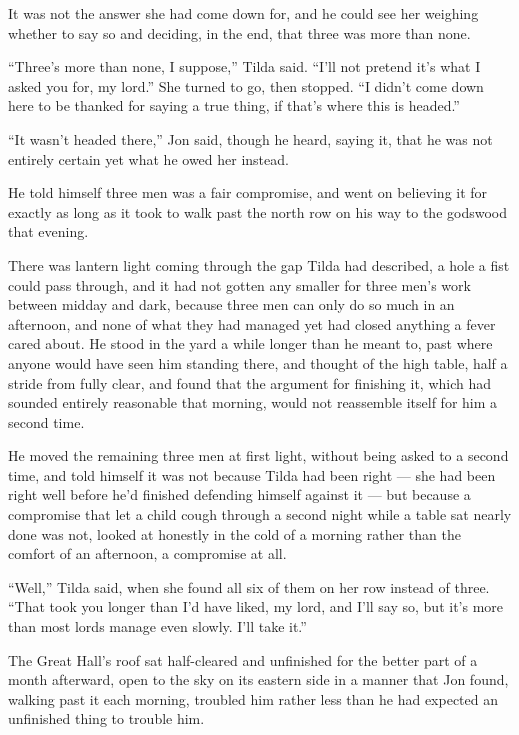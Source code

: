 It was not the answer she had come down for, and he could see her weighing whether to say so and deciding, in the end, that three was more than none.

“Three’s more than none, I suppose,” Tilda said. “I’ll not pretend it’s what I asked you for, my lord.” She turned to go, then stopped. “I didn’t come down here to be thanked for saying a true thing, if that’s where this is headed.”

“It wasn’t headed there,” Jon said, though he heard, saying it, that he was not entirely certain yet what he owed her instead.

\sceneBreak

He told himself three men was a fair compromise, and went on believing it for exactly as long as it took to walk past the north row on his way to the godswood that evening.

There was lantern light coming through the gap Tilda had described, a hole a fist could pass through, and it had not gotten any smaller for three men’s work between midday and dark, because three men can only do so much in an afternoon, and none of what they had managed yet had closed anything a fever cared about. He stood in the yard a while longer than he meant to, past where anyone would have seen him standing there, and thought of the high table, half a stride from fully clear, and found that the argument for finishing it, which had sounded entirely reasonable that morning, would not reassemble itself for him a second time.

He moved the remaining three men at first light, without being asked to a second time, and told himself it was not because Tilda had been right — she had been right well before he’d finished defending himself against it — but because a compromise that let a child cough through a second night while a table sat nearly done was not, looked at honestly in the cold of a morning rather than the comfort of an afternoon, a compromise at all.

“Well,” Tilda said, when she found all six of them on her row instead of three. “That took you longer than I’d have liked, my lord, and I’ll say so, but it’s more than most lords manage even slowly. I’ll take it.”

\sceneBreak

The Great Hall’s roof sat half-cleared and unfinished for the better part of a month afterward, open to the sky on its eastern side in a manner that Jon found, walking past it each morning, troubled him rather less than he had expected an unfinished thing to trouble him.

